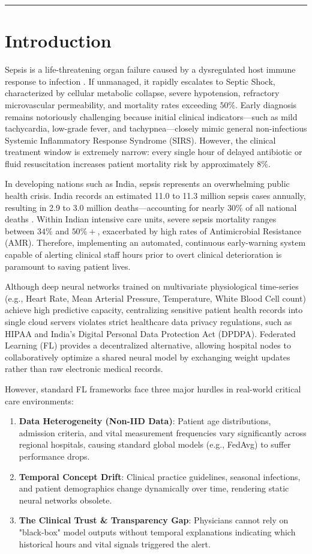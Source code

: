 \documentclass[11pt,a4paper]{article}
\begin{document}
\hrule
\vspace{0.4cm}

\section{Introduction}
Sepsis is a life-threatening organ failure caused by a dysregulated host immune response to infection \cite{dusing2025sepsis}. If unmanaged, it rapidly escalates to Septic Shock, characterized by cellular metabolic collapse, severe hypotension, refractory microvascular permeability, and mortality rates exceeding $50\%$. Early diagnosis remains notoriously challenging because initial clinical indicators—such as mild tachycardia, low-grade fever, and tachypnea—closely mimic general non-infectious Systemic Inflammatory Response Syndrome (SIRS). However, the clinical treatment window is extremely narrow: every single hour of delayed antibiotic or fluid resuscitation increases patient mortality risk by approximately $8\%$.

In developing nations such as India, sepsis represents an overwhelming public health crisis. India records an estimated 11.0 to 11.3 million sepsis cases annually, resulting in 2.9 to 3.0 million deaths—accounting for nearly $30\%$ of all national deaths \cite{kalakoti2025fedxai}. Within Indian intensive care units, severe sepsis mortality ranges between $34\%$ and $50\%+$, exacerbated by high rates of Antimicrobial Resistance (AMR). Therefore, implementing an automated, continuous early-warning system capable of alerting clinical staff hours prior to overt clinical deterioration is paramount to saving patient lives.

Although deep neural networks trained on multivariate physiological time-series (e.g., Heart Rate, Mean Arterial Pressure, Temperature, White Blood Cell count) achieve high predictive capacity, centralizing sensitive patient health records into single cloud servers violates strict healthcare data privacy regulations, such as HIPAA and India's Digital Personal Data Protection Act (DPDPA). Federated Learning (FL) provides a decentralized alternative, allowing hospital nodes to collaboratively optimize a shared neural model by exchanging weight updates rather than raw electronic medical records.

However, standard FL frameworks face three major hurdles in real-world critical care environments:
\begin{enumerate}
\item \textbf{Data Heterogeneity (Non-IID Data)}: Patient age distributions, admission criteria, and vital measurement frequencies vary significantly across regional hospitals, causing standard global models (e.g., FedAvg) to suffer performance drops.
\item \textbf{Temporal Concept Drift}: Clinical practice guidelines, seasonal infections, and patient demographics change dynamically over time, rendering static neural networks obsolete.
\item \textbf{The Clinical Trust \& Transparency Gap}: Physicians cannot rely on "black-box" model outputs without temporal explanations indicating which historical hours and vital signals triggered the alert.
\end{enumerate}
\end{document}
